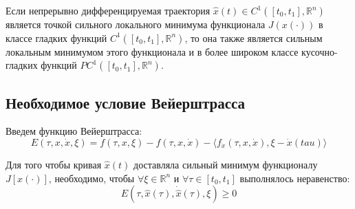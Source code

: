 \begin{corollary}
Если непрерывно дифференцируемая траектория $\hat{x}(t) \in C^1([t_0, t_1], \mathbb{R}^n)$ является точкой сильного локального минимума функционала
$J(x(\cdot))$ в классе гладких функций $C^1([t_0, t_1], \mathbb{R}^n)$, то она также является сильным локальным минимумом этого функционала
и в более широком классе кусочно-гладких функций $PC^1([t_0, t_1], \mathbb{R}^n)$.
\end{corollary}

\subsection{Необходимое условие Вейерштрасса}

Введем функцию Вейерштрасса:
\begin{equation}
  E(\tau, x, \dot{x}, \xi) = f(\tau, x, \xi) - f(\tau, x, \dot{x}) - \langle f_{\dot{x}}(\tau, x, \dot{x}), \xi - \dot{x}(tau) \rangle
\end{equation} 

\begin{theorem}
Для того чтобы кривая $\hat{x}(t)$ доставляла сильный минимум функционалу $J[x(\cdot)]$, необходимо,
чтобы $\forall \xi \in \mathbb{R}^n$ и $\forall \tau \in [t_0, t_1]$ выполнялось неравенство:
$$ E(\tau, \hat{x}(\tau), \dot{\hat{x}}(\tau), \xi) \ge 0 $$ 
\end{theorem}

